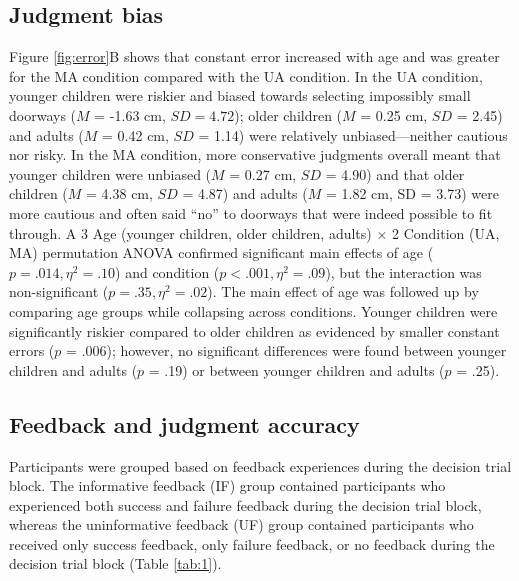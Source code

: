 \documentclass[a4paper,man,natbib,floatsintext,noextraspace]{apa6}
\begin{document}
\subsection{Judgment bias}

Figure \ref{fig:error}B shows that constant error increased with age and was greater for the MA condition compared with the UA condition. In the UA condition, younger children were riskier and biased towards selecting impossibly small doorways ($M$ = -1.63 cm, $SD = 4.72$); older children ($M$ = 0.25 cm, $SD$ = 2.45) and adults ($M$ = 0.42 cm, $SD$ = 1.14) were relatively unbiased---neither cautious nor risky. In the MA condition, more conservative judgments overall meant that younger children were unbiased ($M$ = 0.27 cm, $SD$ = 4.90) and that older children ($M$ = 4.38 cm, $SD$ = 4.87) and adults ($M$ = 1.82 cm, SD = 3.73) were more cautious and often said “no” to doorways that were indeed possible to fit through. A 3 Age (younger children, older children, adults) × 2 Condition (UA, MA) permutation ANOVA confirmed significant main effects of age ($p = .014, \eta^{2} = .10$) and condition ($p < .001, \eta^{2} = .09$), but the interaction was non-significant ($p = .35, \eta^{2} = .02$). The main effect of age was followed up by comparing age groups while collapsing across conditions. Younger children were significantly riskier compared to older children as evidenced by smaller constant errors ($p$ = .006); however, no significant differences were found between younger children and adults ($p$ = .19) or between younger children and adults ($p$ = .25).

\subsection{Feedback and judgment accuracy}

Participants were grouped based on feedback experiences during the decision trial block. The informative feedback (IF) group contained participants who experienced both success and failure feedback during the decision trial block, whereas the uninformative feedback (UF) group contained participants who received only success feedback, only failure feedback, or no feedback during the decision trial block (Table \ref{tab:1}). 
\end{document}
